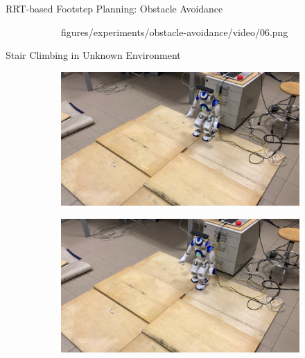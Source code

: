 \documentclass[10pt]{beamer}
\begin{document}
\begin{frame}{RRT-based Footstep Planning: Obstacle Avoidance}
\begin{figure}
\begin{subfigure}{0.40\textwidth}
				{figures/experiments/obstacle-avoidance/video/06.png}
		\end{subfigure}
	\end{figure}
\end{frame}

\begin{frame}{Stair Climbing in Unknown Environment}
	\begin{figure}
		\begin{subfigure}{0.40\textwidth}
			\includegraphics[width=\linewidth]
				{figures/experiments/unknown-env/video/01.jpeg}
		\end{subfigure}\hspace{0.05cm}%
		\begin{subfigure}{0.40\textwidth}
			\includegraphics[width=\linewidth]
				{figures/experiments/unknown-env/video/02.jpeg}
		\end{subfigure}
		\begin{subfigure}{0.40\textwidth}

\end{subfigure}
\end{figure}
\end{frame}
\end{document}
